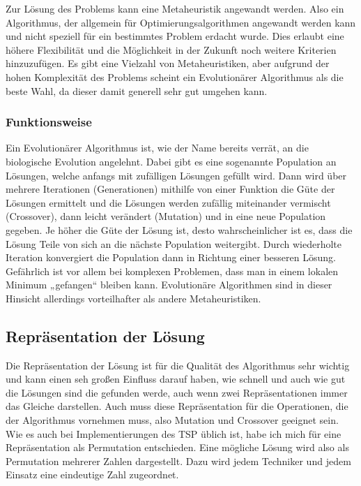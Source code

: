 \documentclass[a4paper,notitlepage,12pt]{report}
\begin{document}
Zur Lösung des Problems kann eine Metaheuristik angewandt werden.
Also ein Algorithmus, der allgemein für Optimierungsalgorithmen
angewandt werden kann und nicht speziell für ein bestimmtes Problem erdacht
wurde. Dies erlaubt eine höhere Flexibilität und die Möglichkeit in der Zukunft
noch weitere Kriterien hinzuzufügen. Es gibt eine Vielzahl von Metaheuristiken,
aber aufgrund der hohen Komplexität des Problems scheint ein Evolutionärer
Algorithmus als die beste Wahl, da dieser damit generell sehr gut umgehen kann.

\subsubsection{Funktionsweise}

Ein Evolutionärer Algorithmus ist, wie der Name bereits verrät, an die biologische
Evolution angelehnt. Dabei gibt es eine sogenannte Population an Lösungen, welche
anfangs mit zufälligen Lösungen gefüllt wird. Dann wird über mehrere
Iterationen (Generationen) mithilfe von einer Funktion die Güte der Lösungen
ermittelt und die Lösungen werden zufällig miteinander vermischt (Crossover), dann
leicht verändert (Mutation) und in eine neue Population gegeben. Je höher die Güte
der Lösung ist, desto wahrscheinlicher ist es, dass die Lösung Teile von sich an
die nächste Population weitergibt. Durch wiederholte Iteration konvergiert die
Population dann in Richtung einer besseren Lösung. Gefährlich ist vor allem bei
komplexen Problemen, dass man in einem lokalen Minimum „gefangen“ bleiben kann.
Evolutionäre Algorithmen sind in dieser Hinsicht allerdings vorteilhafter als
andere Metaheuristiken.

\subsection{Repräsentation der Lösung}

Die Repräsentation der Lösung ist für die Qualität des Algorithmus sehr wichtig
und kann einen seh großen Einfluss darauf haben, wie schnell und auch wie gut die
Lösungen sind die gefunden werde, auch wenn zwei Repräsentationen immer das Gleiche
darstellen. Auch muss diese Repräsentation für die Operationen, die der Algorithmus
vornehmen muss, also Mutation und Crossover geeignet sein. Wie es auch bei
Implementierungen des TSP üblich ist, habe ich mich für eine Repräsentation als
Permutation entschieden. Eine mögliche Lösung wird also als Permutation mehrerer
Zahlen dargestellt. Dazu wird jedem Techniker und jedem Einsatz eine eindeutige
Zahl zugeordnet.
\end{document}
